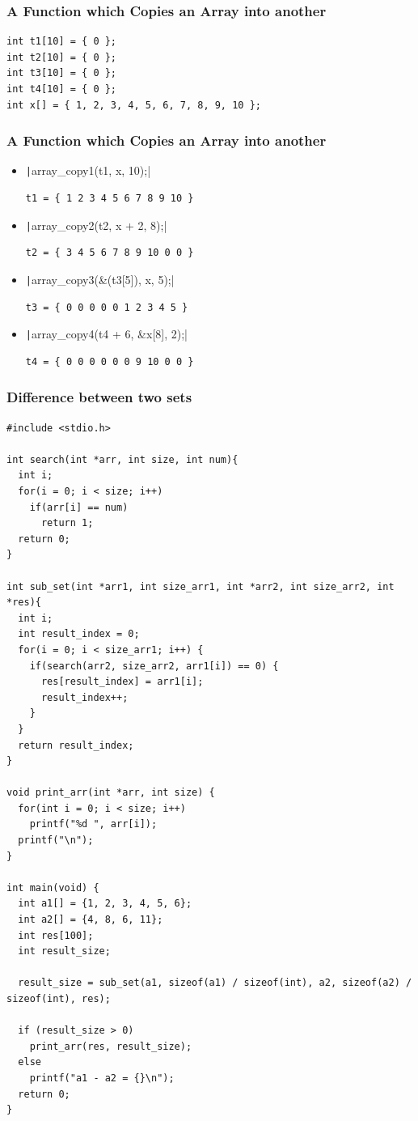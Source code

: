 \documentclass{../c-lecture}
\begin{document}
\begin{frame}[fragile]
  \frametitle{A Function which Copies an Array into another}
  \begin{verbatim}
int t1[10] = { 0 };
int t2[10] = { 0 };
int t3[10] = { 0 };
int t4[10] = { 0 };
int x[] = { 1, 2, 3, 4, 5, 6, 7, 8, 9, 10 };
  \end{verbatim}
\end{frame}

\begin{frame}[fragile]
  \frametitle{A Function which Copies an Array into another}
  \begin{itemize}
    \item \texttt|array_copy1(t1, x, 10);|
    \begin{verbatim}
t1 = { 1 2 3 4 5 6 7 8 9 10 }
    \end{verbatim}
    \item \texttt|array_copy2(t2, x + 2, 8);|
    \begin{verbatim}
t2 = { 3 4 5 6 7 8 9 10 0 0 }
    \end{verbatim}
    \item \texttt|array_copy3(&(t3[5]), x, 5);|
    \begin{verbatim}
t3 = { 0 0 0 0 0 1 2 3 4 5 }
    \end{verbatim}
    \item \texttt|array_copy4(t4 + 6, &x[8], 2);|
    \begin{verbatim}
t4 = { 0 0 0 0 0 0 9 10 0 0 }
    \end{verbatim}
  \end{itemize}
\end{frame}

\begin{frame}[fragile]
  \frametitle{Difference between two sets}
  \tiny
  \begin{verbatim}
#include <stdio.h>

int search(int *arr, int size, int num){
  int i;
  for(i = 0; i < size; i++)
    if(arr[i] == num)
      return 1;
  return 0;
}

int sub_set(int *arr1, int size_arr1, int *arr2, int size_arr2, int *res){
  int i;
  int result_index = 0;
  for(i = 0; i < size_arr1; i++) {
    if(search(arr2, size_arr2, arr1[i]) == 0) {
      res[result_index] = arr1[i];
      result_index++;
    }
  }
  return result_index;
}

void print_arr(int *arr, int size) {
  for(int i = 0; i < size; i++)
    printf("%d ", arr[i]);
  printf("\n");
}

int main(void) {
  int a1[] = {1, 2, 3, 4, 5, 6};
  int a2[] = {4, 8, 6, 11};
  int res[100];
  int result_size;

  result_size = sub_set(a1, sizeof(a1) / sizeof(int), a2, sizeof(a2) / sizeof(int), res);

  if (result_size > 0)
    print_arr(res, result_size);
  else
    printf("a1 - a2 = {}\n");
  return 0;
}
  \end{verbatim}
\end{frame}
\end{document}
